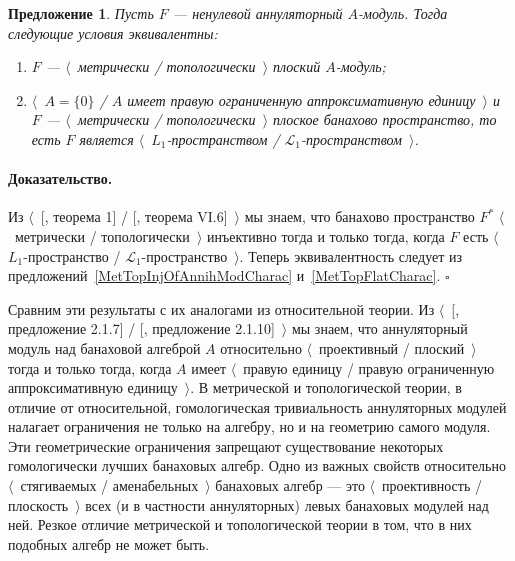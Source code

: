 \documentclass[12pt]{article}
\newtheorem{proposition}[theorem]{Предложение}
\renewenvironment{proof}{\paragraph{Доказательство.}}{\hfill$\square$\medskip}
\begin{document}
\begin{proposition}\label{MetTopFlatAnnihModCharac} Пусть $F$ --- ненулевой
    аннуляторный $A$-модуль. Тогда следующие условия эквивалентны:
    \begin{enumerate}[label = (\roman*)]
        \item $F$ --- $\langle$~метрически / топологически~$\rangle$ плоский
              $A$-модуль;

        \item $\langle$~$A= \{0 \}$ / $A$ имеет правую ограниченную
              аппроксимативную единицу~$\rangle$ и $F$ --- $\langle$~метрически /
              топологически~$\rangle$ плоское банахово пространство, то есть $F$ является
              $\langle$~$L_1$-пространством / $\mathscr{L}_1$-пространством~$\rangle$.
    \end{enumerate}

\end{proposition}
\begin{proof} Из $\langle$~[\cite{GrothMetrProjFlatBanSp}, теорема 1] /
    [\cite{StegRethNucOpL1LInfSp}, теорема VI.6]~$\rangle$ мы знаем, что
    банахово пространство $F^*$ $\langle$~метрически / топологически~$\rangle$
    инъективно тогда и только тогда, когда $F$ есть $\langle$~$L_1$-пространство
    / $\mathscr{L}_1$-пространство~$\rangle$. Теперь эквивалентность следует из
    предложений~\ref{MetTopInjOfAnnihModCharac} и~\ref{MetTopFlatCharac}.
\end{proof}

Сравним эти результаты с их аналогами из относительной теории. Из
$\langle$~[\cite{RamsHomPropSemgroupAlg}, предложение 2.1.7] /
[\cite{RamsHomPropSemgroupAlg}, предложение 2.1.10]~$\rangle$ мы знаем, что
аннуляторный модуль над банаховой алгеброй $A$  относительно
$\langle$~проективный / плоский~$\rangle$ тогда и только тогда, когда $A$ имеет
$\langle$~правую единицу / правую ограниченную аппроксимативную
единицу~$\rangle$. В метрической и топологической теории, в отличие от
относительной, гомологическая тривиальность аннуляторных модулей налагает
ограничения не только на алгебру, но и на геометрию самого модуля. Эти
геометрические ограничения запрещают существование некоторых гомологически
лучших банаховых алгебр. Одно из важных свойств относительно
$\langle$~стягиваемых / аменабельных~$\rangle$ банаховых алгебр --- это
$\langle$~проективность / плоскость~$\rangle$ всех (и в частности аннуляторных)
левых банаховых модулей над ней. Резкое отличие метрической и топологической
теории в том, что в них подобных алгебр не может быть.
\end{document}
